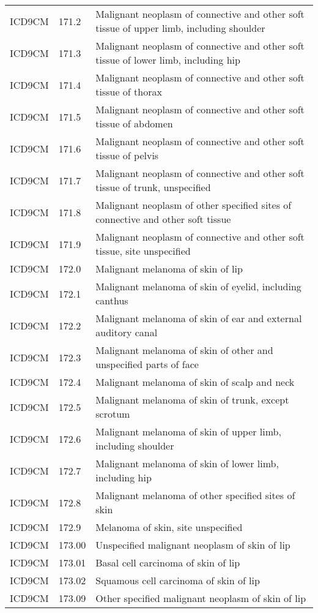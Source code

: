 \begin{longtable}{p{}p{}p{}}
  ICD9CM & 171.2 & Malignant neoplasm of connective and other soft tissue of upper limb, including shoulder \\ 
  ICD9CM & 171.3 & Malignant neoplasm of connective and other soft tissue of lower limb, including hip \\ 
  ICD9CM & 171.4 & Malignant neoplasm of connective and other soft tissue of thorax \\ 
  ICD9CM & 171.5 & Malignant neoplasm of connective and other soft tissue of abdomen \\ 
  ICD9CM & 171.6 & Malignant neoplasm of connective and other soft tissue of pelvis \\ 
  ICD9CM & 171.7 & Malignant neoplasm of connective and other soft tissue of trunk, unspecified \\ 
  ICD9CM & 171.8 & Malignant neoplasm of other specified sites of connective and other soft tissue \\ 
  ICD9CM & 171.9 & Malignant neoplasm of connective and other soft tissue, site unspecified \\ 
  ICD9CM & 172.0 & Malignant melanoma of skin of lip \\ 
  ICD9CM & 172.1 & Malignant melanoma of skin of eyelid, including canthus \\ 
  ICD9CM & 172.2 & Malignant melanoma of skin of ear and external auditory canal \\ 
  ICD9CM & 172.3 & Malignant melanoma of skin of other and unspecified parts of face \\ 
  ICD9CM & 172.4 & Malignant melanoma of skin of scalp and neck \\ 
  ICD9CM & 172.5 & Malignant melanoma of skin of trunk, except scrotum \\ 
  ICD9CM & 172.6 & Malignant melanoma of skin of upper limb, including shoulder \\ 
  ICD9CM & 172.7 & Malignant melanoma of skin of lower limb, including hip \\ 
  ICD9CM & 172.8 & Malignant melanoma of other specified sites of skin \\ 
  ICD9CM & 172.9 & Melanoma of skin, site unspecified \\ 
  ICD9CM & 173.00 & Unspecified malignant neoplasm of skin of lip \\ 
  ICD9CM & 173.01 & Basal cell carcinoma of skin of lip \\ 
  ICD9CM & 173.02 & Squamous cell carcinoma of skin of lip \\ 
  ICD9CM & 173.09 & Other specified malignant neoplasm of skin of lip \\ 

\end{longtable}
